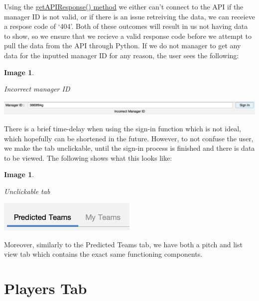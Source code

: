 \documentclass[12pt, a4paper, oneside]{book}
\newtheorem{image}[theorem]{Image}
\numberwithin{equation}{section}
\begin{document}
Using the \hyperref[getAPIResponse method]{getAPIResponse() method} we either can't connect to the API if the manager ID is not valid, or if there is an issue retreiving the data, we can receieve a respose code of `404'. Both of these outcomes will result in us not having data to show, so we ensure that we recieve a valid response code before we attempt to pull the data from the API through Python. If we do not manager to get any data for the inputted manager ID for any reason, the user sees the following:

\begin{image} \label{Incorrect manager id}

  Incorrect manager ID

  \vspace{0.5cm}

  \centerline{\includegraphics[width=1\textwidth]{images/gui/fantasy-tab/incorrect-manager-id.png}}

\end{image}

There is a brief time-delay when using the sign-in function which is not ideal, which hopefully can be shortened in the future. However, to not confuse the user, we make the tab unclickable, until the sign-in process is finished and there is data to be viewed. The following shows what this looks like:

\begin{image} \label{Unclickable tab}

  Unclickable tab

  \vspace{0.5cm}

  \centerline{\includegraphics[width=0.5\textwidth]{images/gui/fantasy-tab/unclickable-tab.png}}

\end{image}

Moreover, similarly to the Predicted Teams tab, we have both a pitch and list view tab which contains the exact same functioning components.

\section{Players Tab}\label{sec:6.6}
\end{document}
